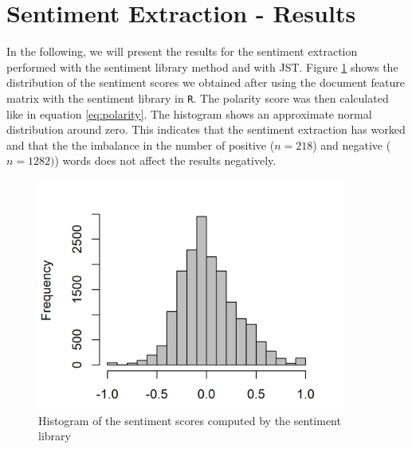 \section{Sentiment Extraction - Results}\label{SentimentExtract}
In the following, we will present the results for the sentiment extraction performed with the sentiment library method and with JST. Figure \ref{fig:BoWSentiment} shows the distribution of the sentiment scores we obtained after using the document feature matrix \citep{quanteda} with the sentiment library in \texttt{R}. The polarity score was then calculated like in equation \ref{eq:polarity}. The histogram shows an approximate normal distribution around zero. This indicates that the sentiment extraction has worked and that the the imbalance in the number of positive ($n = 218$) and negative ($n = 1282)$) words does not affect the results negatively. 

\begin{figure}[h]
\centering
\includegraphics[width=4in]{figures/2SentimentsBOW_Histogram.png}
\caption{Histogram of the sentiment scores computed by the sentiment library}
\label{fig:BoWSentiment}
\end{figure}

